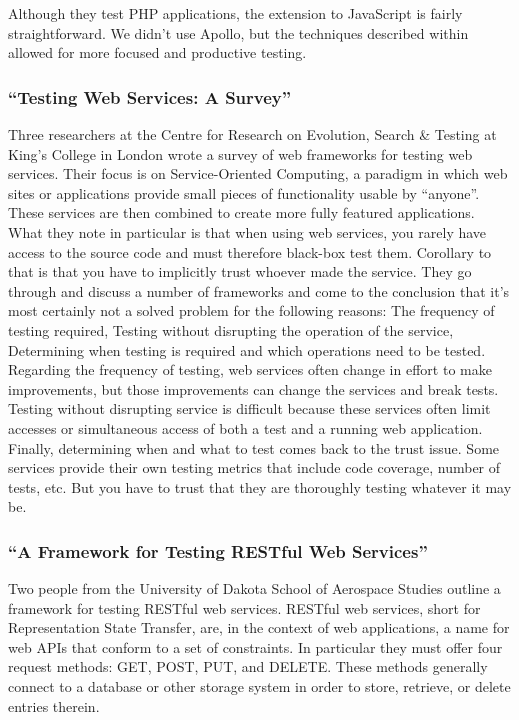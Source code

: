 \documentclass[11pt]{article}
\begin{document}
Although they test PHP applications, the extension to JavaScript is fairly straightforward. We didn't use Apollo, but the techniques described within allowed for more focused and productive testing.

\subsubsection{``Testing Web Services: A Survey'' \cite{TestingWebServicesSurvey}}
Three researchers at the Centre for Research on Evolution, Search \& Testing at King's College in London wrote a survey of web frameworks for testing web services. Their focus is on Service-Oriented Computing, a paradigm in which web sites or applications provide small pieces of functionality usable by ``anyone''. These services are then combined to create more fully featured applications. What they note in particular is that when using web services, you rarely have access to the source code and must therefore black-box test them. Corollary to that is that you have to implicitly trust whoever made the service. They go through and discuss a number of frameworks and come to the conclusion that it's most certainly not a solved problem for the following reasons: The frequency of testing required, Testing without disrupting the operation of the service, Determining when testing is required and which operations need to be tested. Regarding the frequency of testing, web services often change in effort to make improvements, but those improvements can change the services and break tests. Testing without disrupting service is difficult because these services often limit accesses or simultaneous access of both a test and a running web application. Finally, determining when and what to test comes back to the trust issue. Some services provide their own testing metrics that include code coverage, number of tests, etc. But you have to trust that they are thoroughly testing whatever it may be.

\subsubsection{``A Framework for Testing RESTful Web Services'' \cite{RESTfulFramework}}
Two people from the University of Dakota School of Aerospace Studies outline a framework for testing RESTful web services. RESTful web services, short for Representation State Transfer, are, in the context of web applications, a name for web APIs that conform to a set of constraints. In particular they must offer four request methods: GET, POST, PUT, and DELETE. These methods generally connect to a database or other storage system in order to store, retrieve, or delete entries therein.
\end{document}
